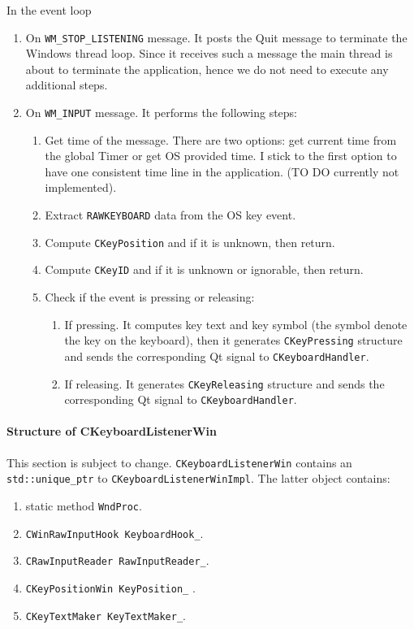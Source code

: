 \documentclass{article}
\begin{document}
In the event loop
\begin{enumerate}
\item On \verb"WM_STOP_LISTENING" message. It posts the Quit message to terminate the Windows thread loop. Since it receives such a message the main thread is about to terminate the application, hence we do not need to execute any additional steps.

\item On \verb"WM_INPUT" message. It performs the following steps:
\begin{enumerate}
\item Get time of the message. There are two options: get current time from the global Timer or get OS provided time. I stick to the first option to have one consistent time line in the application. (TO DO currently not implemented).

\item Extract \verb"RAWKEYBOARD" data from the OS key event.

\item Compute \verb"CKeyPosition" and if it is unknown, then return.

\item Compute \verb"CKeyID" and if it is unknown or ignorable, then return.

\item Check if the event is pressing or releasing:
\begin{enumerate}
\item If pressing. It computes key text and key symbol (the symbol denote the key on the keyboard), then it generates \verb"CKeyPressing" structure and sends the corresponding Qt signal to \verb"CKeyboardHandler".

\item If releasing. It generates \verb"CKeyReleasing" structure and sends the corresponding Qt signal to \verb"CKeyboardHandler".

\end{enumerate}
\end{enumerate}
\end{enumerate}


\paragraph{Structure of CKeyboardListenerWin}

This section is subject to change.
\verb"CKeyboardListenerWin" contains an \verb"std::unique_ptr" to \verb"CKeyboardListenerWinImpl". The latter object contains:
\begin{enumerate}
\item static method \verb"WndProc".
\item \verb"CWinRawInputHook KeyboardHook_".
\item \verb"CRawInputReader RawInputReader_".
\item \verb"CKeyPositionWin KeyPosition_" .
\item \verb"CKeyTextMaker KeyTextMaker_".
\end{enumerate}
\end{document}
